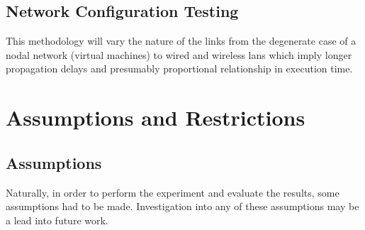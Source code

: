 \subsection{Network Configuration Testing}

This methodology will vary the nature of the links from the degenerate case of a nodal network (virtual machines) to wired and wireless \gls{lan}s which imply longer propagation delays and presumably proportional relationship in execution time.

\section{Assumptions and Restrictions}










\subsection{Assumptions}
\label{Assumptions}

Naturally, in order to perform the experiment and evaluate the results, some assumptions had to be made.
Investigation into any of these assumptions may be a lead into future work.

